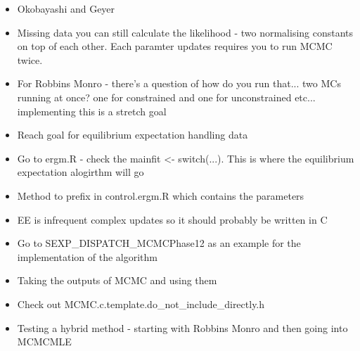 \begin{itemize}
\begin{itemize}
        \item Okobayashi and Geyer
        \item Missing data you can still calculate the likelihood - two normalising constants on top of each other. Each paramter updates requires you to run MCMC twice. 
        \item For Robbins Monro - there's a question of how do you run that... two MCs running at once? one for constrained and one for unconstrained etc... implementing this is a stretch goal
        \item Reach goal for equilibrium expectation handling data
        \item Go to ergm.R - check the mainfit <- switch(...). This is where the equilibrium expectation alogirthm will go
        \item Method to prefix in control.ergm.R which contains the parameters 
        \item EE is infrequent complex updates so it should probably be written in C
        \item Go to SEXP\_DISPATCH\_MCMCPhase12 as an example for the implementation of the algorithm
        \item Taking the outputs of MCMC and using them 
        \item Check out MCMC.c.template.do\_not\_include\_directly.h
        \item Testing a hybrid method - starting with Robbins Monro and then going into MCMCMLE
    \end{itemize}
\end{itemize}